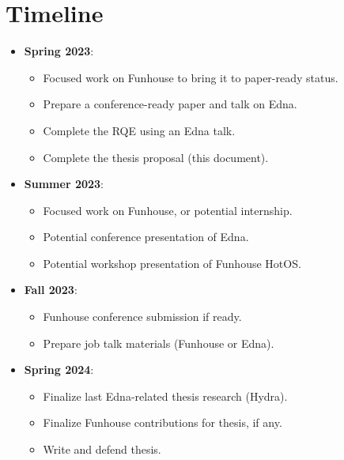\begin{comment}
    Anticipated challenges and mitigations
    Concrete deliverables and expected completion times
\end{comment}

\section{Timeline}
\begin{itemize}
\item \textbf{Spring 2023}: 
    \begin{itemize}
        \item Focused work on Funhouse to bring it to paper-ready status.
        \item Prepare a conference-ready paper and talk on Edna.
        \item Complete the RQE using an Edna talk.
        \item Complete the thesis proposal (this document).
    \end{itemize}
\item \textbf{Summer 2023}: 
    \begin{itemize}
        \item Focused work on Funhouse, or potential internship.
        \item Potential conference presentation of Edna.
        \item Potential workshop presentation of Funhouse HotOS.
    \end{itemize}
\item \textbf{Fall 2023}: 
    \begin{itemize}
        \item Funhouse conference submission if ready.
        \item Prepare job talk materials (Funhouse or Edna).
    \end{itemize}
\item \textbf{Spring 2024}: 
    \begin{itemize}
        \item Finalize last Edna-related thesis research (Hydra).
        \item Finalize Funhouse contributions for thesis, if any.
        \item Write and defend thesis.
    \end{itemize}
\end{itemize}
